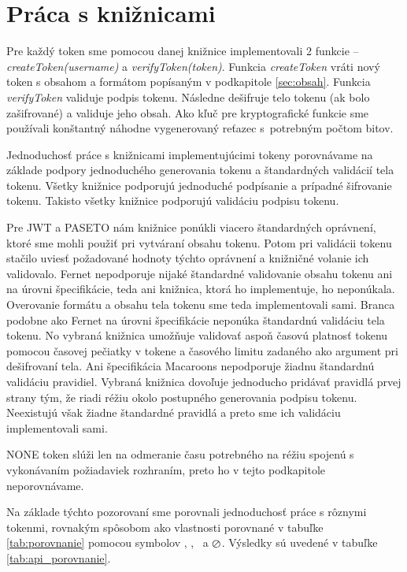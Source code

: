 \section{Práca s knižnicami}

Pre každý token sme pomocou danej knižnice implementovali 2 funkcie -- \textit{createToken(username)} a \textit{verifyToken(token)}. Funkcia \textit{createToken} vráti nový token s obsahom a formátom popísaným v podkapitole \ref{sec:obsah}. Funkcia \textit{verifyToken} validuje podpis tokenu. Následne dešifruje telo tokenu (ak bolo zašifrované) a validuje jeho obsah. Ako kľuč pre kryptografické funkcie sme používali konštantný náhodne vygenerovaný reťazec s~potrebným počtom bitov.

Jednoduchosť práce s knižnicami implementujúcimi tokeny porovnávame na základe podpory jednoduchého generovania tokenu a štandardných validácií tela tokenu.
Všetky knižnice podporujú jednoduché podpísanie a prípadné šifrovanie tokenu. Takisto všetky knižnice podporujú validáciu podpisu tokenu. 

Pre JWT a PASETO nám knižnice ponúkli viacero štandardných oprávnení, ktoré sme mohli použiť pri vytváraní obsahu tokenu. Potom pri validácii tokenu stačilo uviesť požadované hodnoty týchto oprávnení a knižničné volanie ich validovalo. Fernet nepodporuje nijaké štandardné validovanie obsahu tokenu ani na úrovni špecifikácie, teda ani knižnica, ktorá ho implementuje, ho neponúkala. Overovanie formátu a obsahu tela tokenu sme teda implementovali sami. Branca podobne ako Fernet na úrovni špecifikácie neponúka štandardnú validáciu tela tokenu. No vybraná knižnica umožňuje validovať aspoň časovú platnosť tokenu pomocou časovej pečiatky v tokene a časového limitu zadaného ako argument pri dešifrovaní tela. Ani špecifikácia Macaroons nepodporuje žiadnu štandardnú validáciu pravidiel. Vybraná knižnica dovoľuje jednoducho pridávať pravidlá prvej strany tým, že riadi réžiu okolo postupného generovania podpisu tokenu. Neexistujú však žiadne štandardné pravidlá a preto sme ich validáciu implementovali sami.

NONE token slúži len na odmeranie času potrebného na réžiu spojenú s vykonávaním požiadaviek rozhraním, preto ho v tejto podkapitole neporovnávame.

Na základe týchto pozorovaní sme porovnali jednoduchosť práce s rôznymi tokenmi, rovnakým spôsobom ako vlastnosti porovnané v tabuľke \ref{tab:porovnanie} pomocou symbolov \CIRCLE, \LEFTcircle, \Circle ~a $\varoslash$. Výsledky sú uvedené v tabuľke \ref{tab:api_porovnanie}.

